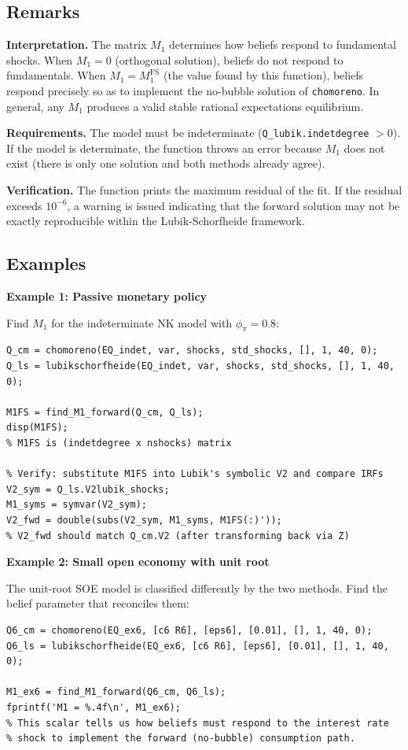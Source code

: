 \documentclass{article}
\begin{document}
\subsection{Remarks}

\noindent\textbf{Interpretation.} The matrix $M_1$ determines how beliefs respond to fundamental shocks. When $M_1 = 0$ (orthogonal solution), beliefs do not respond to fundamentals. When $M_1 = M_1^{\text{FS}}$ (the value found by this function), beliefs respond precisely so as to implement the no-bubble solution of \texttt{chomoreno}. In general, any $M_1$ produces a valid stable rational expectations equilibrium.

\medskip
\noindent\textbf{Requirements.} The model must be indeterminate (\texttt{Q\_lubik.indetdegree} $> 0$). If the model is determinate, the function throws an error because $M_1$ does not exist (there is only one solution and both methods already agree).

\medskip
\noindent\textbf{Verification.} The function prints the maximum residual of the fit. If the residual exceeds $10^{-6}$, a warning is issued indicating that the forward solution may not be exactly reproducible within the Lubik-Schorfheide framework.

\subsection{Examples}

\noindent\textbf{Example 1: Passive monetary policy}

\medskip
\noindent Find $M_1$ for the indeterminate NK model with $\phi_\pi = 0.8$:
\begin{verbatim}
Q_cm = chomoreno(EQ_indet, var, shocks, std_shocks, [], 1, 40, 0);
Q_ls = lubikschorfheide(EQ_indet, var, shocks, std_shocks, [], 1, 40, 0);

M1FS = find_M1_forward(Q_cm, Q_ls);
disp(M1FS);
% M1FS is (indetdegree x nshocks) matrix

% Verify: substitute M1FS into Lubik's symbolic V2 and compare IRFs
V2_sym = Q_ls.V2lubik_shocks;
M1_syms = symvar(V2_sym);
V2_fwd = double(subs(V2_sym, M1_syms, M1FS(:)'));
% V2_fwd should match Q_cm.V2 (after transforming back via Z)
\end{verbatim}

\vspace{1em}
\noindent\textbf{Example 2: Small open economy with unit root}

\medskip
\noindent The unit-root SOE model is classified differently by the two methods. Find the belief parameter that reconciles them:
\begin{verbatim}
Q6_cm = chomoreno(EQ_ex6, [c6 R6], [eps6], [0.01], [], 1, 40, 0);
Q6_ls = lubikschorfheide(EQ_ex6, [c6 R6], [eps6], [0.01], [], 1, 40, 0);

M1_ex6 = find_M1_forward(Q6_cm, Q6_ls);
fprintf('M1 = %.4f\n', M1_ex6);
% This scalar tells us how beliefs must respond to the interest rate
% shock to implement the forward (no-bubble) consumption path.
\end{verbatim}
\end{document}
